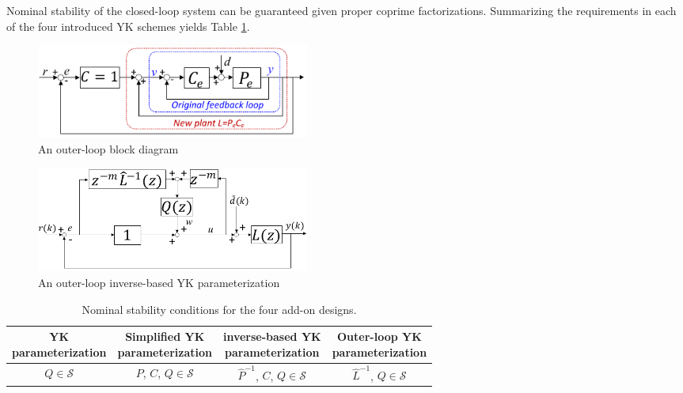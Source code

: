 \documentclass [11pt, proquest] {uwthesis}[2020/02/24]
\begin{document}
Nominal stability of the closed-loop system can be guaranteed given
proper coprime factorizations. Summarizing the requirements in each
of the four introduced YK schemes yields Table \ref{tab:Nominal-stability-conditions}.
\begin{figure}[!ht]
\begin{centering}
\includegraphics[width=9cm]{Loop-shaping/block diagram-BL}
\par\end{centering}
\caption{\label{fig:A-discrete-time-inverse-based-1-1}An outer-loop block
diagram}
\end{figure}
\begin{figure}[!ht]
\begin{centering}
\includegraphics[width=9cm]{Loop-shaping/L-YK parameterization}
\par\end{centering}
\caption{\label{fig:A-outer-loop-inverse-based}An outer-loop inverse-based
YK parameterization}
\end{figure}
\begin{table}[!ht]
\caption{\label{tab:Nominal-stability-conditions}Nominal stability conditions
for the four add-on designs.}
\begin{centering}

\setlength\tabcolsep{1.5pt}

\begin{tabular}{cccc} 

\toprule

\makecell{YK \\ parameterization} & \makecell{Simplified YK \\ parameterization} & \makecell{inverse-based YK \\ parameterization} & \makecell{Outer-loop YK \\ parameterization}\\

\midrule

$Q\in\mathcal{S}$ & $P$, $C$, $Q\in\mathcal{S}$ & $\hat{P}^{-1}$, $C$, $Q\in\mathcal{S}$ & $\hat{L}^{-1}$, $Q\in\mathcal{S}$\\

\bottomrule
\end{tabular}
\par\end{centering}
\end{table}
\end{document}
